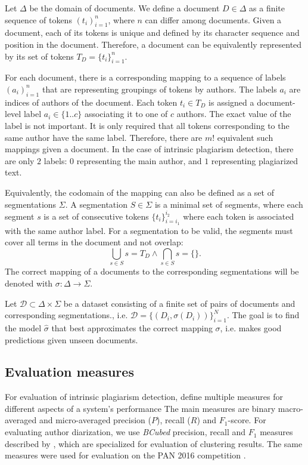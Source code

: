 \documentclass[10pt, a4paper]{article}
\begin{document}
Let $\Delta$ be the domain of documents. We define a document $D\in \Delta$ as a finite sequence of tokens $(t_i)_{i=1}^n$, where $n$ can differ among documents. Given a document, each of its tokens is unique and defined by its character sequence and position in the document. Therefore, a document can be equivalently represented by its set of tokens $T_D=\{t_i\}_{i=1}^n$.

For each document, there is a corresponding mapping to a sequence of labels $(a_i)_{i=1}^n$ that are representing groupings of tokens by authors. The labels $a_i$ are indices of authors of the document. Each token $t_i\in T_D$ is assigned a document-level label $a_i \in \{1..c\}$ associating it to one of $c$ authors. The exact value of the label is not important. It is only required that all tokens corresponding to the same author have the same label. Therefore, there are $m!$ equivalent such mappings given a document. In the case of intrinsic plagiarism detection, there are only $2$ labels: $0$ representing the main author, and $1$ representing plagiarized text.

Equivalently, the codomain of the mapping can also be defined as a set of segmentations $\Sigma$. A segmentation $S\in \Sigma$ is a minimal set of segments, where each segment $s$ is a set of consecutive tokens $\{t_i\}_{i=i_1}^{i_2}$ where each token is associated with the same author label. For a segmentation to be valid, the segments must cover all terms in the document and not overlap:
\begin{equation}
	\bigcup_{s\in S}s = T_D  \wedge \bigcap_{s\in S}s = \{\}.
\end{equation}
The correct mapping of a documents to the corresponding segmentations will be denoted with $\sigma: \Delta\rightarrow\Sigma$.

Let $\mathcal{D} \subset \Delta\times\Sigma$ be a dataset consisting of a finite set of pairs of documents and corresponding segmentations., i.e. $\mathcal{D} = \{\left(D_i, \sigma(D_i)\right)\}_{i=1}^N$. The goal is to find the model $\hat{\sigma}$ that best approximates the correct mapping $\sigma$, i.e. makes good predictions given unseen documents.

\subsection{Evaluation measures}

For evaluation of intrinsic plagiarism detection, \citet{stein-2010} define multiple measures for different aspects of a system's performance The main measures are binary macro-averaged and micro-averaged precision ($P$), recall ($R$) and $F_1$-score. For evaluating author diarization, we use \emph{BCubed} precision, recall and $F_1$ measures described by \citet{amigo-2009}, which are specialized for evaluation of clustering results. The same measures were used for evaluation on the PAN 2016 competition \citep{rosso-2016}.
\end{document}
